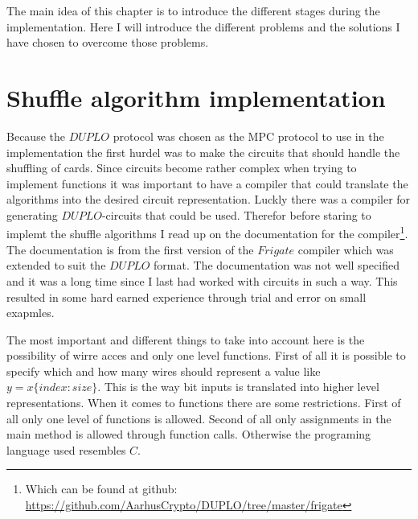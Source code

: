 The main idea of this chapter is to introduce the different stages during the implementation. Here I will introduce the different problems and the solutions I have chosen to overcome those problems.


\section{Shuffle algorithm implementation}


Because the $DUPLO$ protocol was chosen as the MPC protocol to use in the implementation the first hurdel was to make the circuits that should handle the shuffling of cards. Since circuits become rather complex when trying to implement functions it was important to have a compiler that could translate the algorithms into the desired circuit representation. Luckly there was a compiler for generating $DUPLO$-circuits that could be used. Therefor before staring to implemt the shuffle algorithms I read up on the documentation for the compiler\footnote{Which can be found at github: \url{https://github.com/AarhusCrypto/DUPLO/tree/master/frigate}}. The documentation is from the first version of the $Frigate$ compiler which was extended to suit the $DUPLO$ format. The documentation was not well specified and it was a long time since I last had worked with circuits in such a way. This resulted in some hard earned experience through trial and error on small exapmles.

The most important and different things to take into account here is the possibility of wirre acces and only one level functions. First of all it is possible to specify which and how many wires should represent a value like $y=x\{index:size\}$. This is the way bit inputs is translated into higher level representations. When it comes to functions there are some restrictions. First of all only one level of functions is allowed. Second of all only assignments in the main method is allowed through function calls. Otherwise the programing language used resembles $C$.

\bigskip


